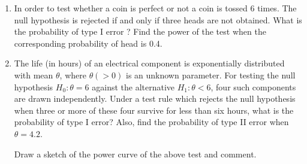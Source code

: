 \documentclass[11pt, a4paper]{article}
\begin{document}
\begin{enumerate}
	
	
	
	
	
	
	\item In order to test whether a coin is perfect or not a coin is tossed 6 times. The null hypothesis is rejected if and only if three heads are not obtained. What is the probability of type I error ? Find the power of the test when the corresponding probability of head is 0.4.
	
	
	
	
	
	
	\item The life (in hours) of an electrical component is exponentially distributed with mean $\theta$, where $\theta (> 0)$ is an unknown parameter. For testing the null hypothesis $H_0 : \theta = 6$ against the alternative $H_1 : \theta < 6$, four such components are drawn independently. Under a test rule which rejects the null hypothesis when three or more of these four survive for less than six hours, what is the probability of type I error? Also, find the probability of type II error when $\theta = 4.2$.
	
	Draw a sketch of the power curve of the above test and comment.
\end{enumerate}
\end{document}
